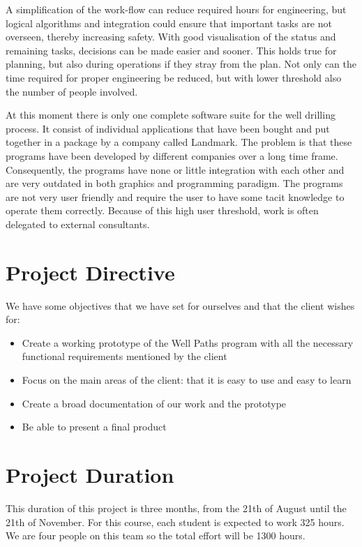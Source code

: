 \documentclass{report}
\begin{document}
A simplification of the work-flow can reduce required hours for engineering, but logical algorithms and integration could ensure that important tasks are not overseen, thereby increasing safety. With good visualisation of the status and remaining tasks, decisions can be made easier and sooner. This holds true for planning, but also during operations if they stray from the plan. Not only can the time required for proper engineering be reduced, but with lower threshold also the number of people involved.

At this moment there is only one complete software suite for the well drilling process. It consist of individual applications that have been bought and put together in a package by a company called Landmark. The problem is that these programs have been developed by different companies over a long time frame. Consequently, the programs have none or little integration with each other and are very outdated in both graphics and programming paradigm. The programs are not very user friendly and require the user to have some tacit knowledge to operate them correctly. Because of this high user threshold, work is often delegated to external consultants.

\section{Project Directive} \label{sec:project_directive}
We have some objectives that we have set for ourselves and that the client wishes for:

\begin{itemize}
    \item Create a working prototype of the Well Paths program with all the necessary functional requirements mentioned by the client
    \item Focus on the main areas of the client: that it is easy to use and easy to learn
    \item Create a broad documentation of our work and the prototype
    \item Be able to present a final product
\end{itemize}

\section{Project Duration} \label{sec:project_duration}
This duration of this project is three months, from the 21th of August until the 21th of November. For this course, each student is expected to work 325 hours. We are four people on this team so the total effort will be 1300 hours.
\end{document}
